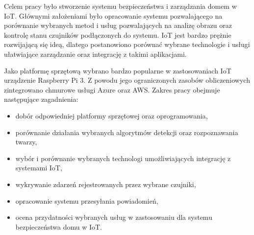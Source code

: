 Celem pracy było stworzenie systemu bezpieczeństwa i zarządzania domem w IoT. Głównymi założeniami było opracowanie systemu pozwalającego na porównanie wybranych metod i usług pozwalających na analizę obrazu oraz kontrolę stanu czujników podłączonych do systemu. IoT jest bardzo prężnie rozwijającą się ideą, dlatego postanowiono porównać wybrane technologie i usługi ułatwiające zarządzanie oraz integrację z takimi aplikacjami.

Jako platformę sprzętową wybrano bardzo popularne w zastosowaniach IoT urządzenie Raspberry Pi 3. Z powodu jego ograniczonych zasobów obliczeniowych zintegrowano chmurowe usługi Azure oraz AWS. Zakres pracy obejmuje następujące zagadnienia:
\begin{itemize}
\item dobór odpowiedniej platformy sprzętowej oraz oprogramowania,
\item porównanie działania wybranych algorytmów detekcji oraz rozpoznawania twarzy,
\item wybór i porównanie wybranych technologi umożliwiających integrację z systemami IoT,
\item wykrywanie zdarzeń rejestrowanych przez wybrane czujniki,
\item opracowanie systemu przesyłania powiadomień,
\item ocena przydatności wybranych usług w zastosowaniu dla systemu bezpieczeństwa domu w IoT.
\end{itemize}